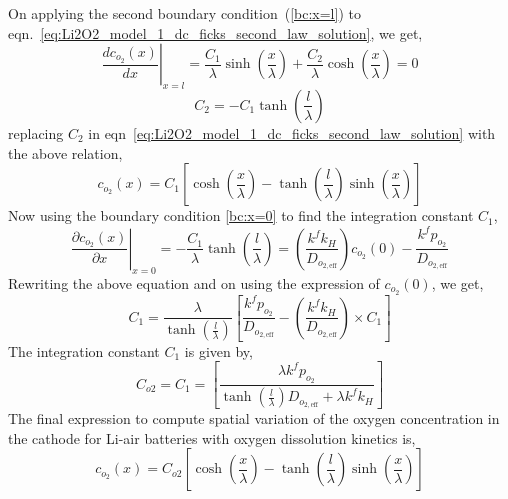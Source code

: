 \documentclass[Notes.tex]{subfiles}
\begin{document}
On applying the second boundary condition~(\ref{bc:x=l}) to eqn.~\ref{eq:Li2O2_model_1_dc_ficks_second_law_solution}, we get,
\begin{equation}
\left.\frac{dc_{o_2}(x)}{dx}\right|_{x=l} = \frac{C_1}{\lambda}\sinh{\left(\frac{x}{\lambda}\right)} + \frac{C_2}{\lambda}\cosh{\left(\frac{x}{\lambda}\right)} =0\nonumber
\end{equation}
\begin{equation}
C_2 = -C_1\tanh{\left(\frac{l}{\lambda}\right)}
\end{equation}
replacing $C_2$ in eqn~\ref{eq:Li2O2_model_1_dc_ficks_second_law_solution} with the above relation,
\begin{equation}
c_{o_2}(x)=C_1\left[\cosh{\left(\frac{x}{\lambda}\right)}-\tanh{\left(\frac{l}{\lambda}\right)}\sinh{\left(\frac{x}{\lambda}\right)}\right]
\end{equation}
Now using the boundary condition \ref{bc:x=0} to find the integration constant $C_1$,
\begin{equation}
\left.\frac{\partial c_{o_2}(x)}{\partial x}\right|_{x=0} =  -\frac{C_1}{\lambda}\tanh{\left(\frac{l}{\lambda}\right)} =  \left(\frac{k^f k_H}{D_{o_{2,\textrm{eff}}}}\right) c_{o_2}(0) - \frac{k^fp_{o_2}}{D_{o_{2,\textrm{eff}}}}\nonumber
\end{equation}
Rewriting the above equation and on using the expression of $c_{o_2}(0)$, we get, 
\begin{equation}
C_1 = \frac{\lambda}{\tanh{\left(\frac{l}{\lambda}\right)}}\left[\frac{k^fp_{o_2}}{D_{o_{2,\textrm{eff}}}} - \left(\frac{k^f k_H}{D_{o_{2,\textrm{eff}}}}\right)\times C_1 \right]\nonumber
\end{equation}
The integration constant $C_1$ is given by,
\begin{equation}
C_{o2} = C_1 = \left[\frac{\lambda k^fp_{o_2}} {\tanh{\left(\frac{l}{\lambda}\right)} D_{o_{2,\textrm{eff}}} + \lambda k^f k_H}\right]
\end{equation}
The final expression to compute spatial variation of the oxygen concentration in the cathode for Li-air batteries with oxygen dissolution kinetics is,
\begin{equation}
c_{o_2}(x)=C_{o2}\left[\cosh{\left(\frac{x}{\lambda}\right)}-\tanh{\left(\frac{l}{\lambda}\right)}\sinh{\left(\frac{x}{\lambda}\right)}\right]\label{eq:dc_oxygen_concentration_diffusion_kinetics}
\end{equation}
\end{document}

